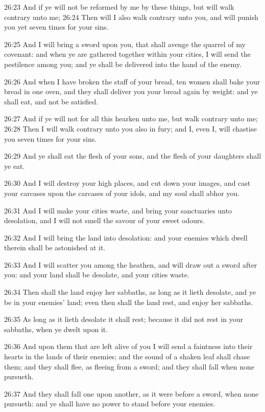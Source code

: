 26:23 And if ye will not be reformed by me by these things, but will
walk contrary unto me; 26:24 Then will I also walk contrary unto you,
and will punish you yet seven times for your sins.

26:25 And I will bring a sword upon you, that shall avenge the quarrel
of my covenant: and when ye are gathered together within your cities,
I will send the pestilence among you; and ye shall be delivered into
the hand of the enemy.

26:26 And when I have broken the staff of your bread, ten women shall
bake your bread in one oven, and they shall deliver you your bread
again by weight: and ye shall eat, and not be satisfied.

26:27 And if ye will not for all this hearken unto me, but walk
contrary unto me; 26:28 Then I will walk contrary unto you also in
fury; and I, even I, will chastise you seven times for your sins.

26:29 And ye shall eat the flesh of your sons, and the flesh of your
daughters shall ye eat.

26:30 And I will destroy your high places, and cut down your images,
and cast your carcases upon the carcases of your idols, and my soul
shall abhor you.

26:31 And I will make your cities waste, and bring your sanctuaries
unto desolation, and I will not smell the savour of your sweet odours.

26:32 And I will bring the land into desolation: and your enemies
which dwell therein shall be astonished at it.

26:33 And I will scatter you among the heathen, and will draw out a
sword after you: and your land shall be desolate, and your cities
waste.

26:34 Then shall the land enjoy her sabbaths, as long as it lieth
desolate, and ye be in your enemies' land; even then shall the land
rest, and enjoy her sabbaths.

26:35 As long as it lieth desolate it shall rest; because it did not
rest in your sabbaths, when ye dwelt upon it.

26:36 And upon them that are left alive of you I will send a faintness
into their hearts in the lands of their enemies; and the sound of a
shaken leaf shall chase them; and they shall flee, as fleeing from a
sword; and they shall fall when none pursueth.

26:37 And they shall fall one upon another, as it were before a sword,
when none pursueth: and ye shall have no power to stand before your
enemies.

